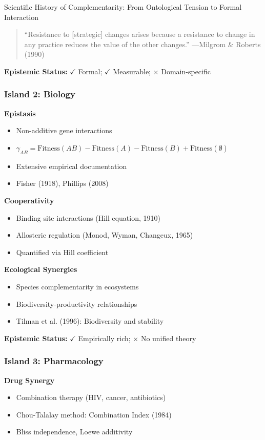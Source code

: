 \begin{chapter}{Scientific History of Complementarity: From Ontological Tension to Formal Interaction}
\begin{quote}
``Resistance to [strategic] changes arises because a resistance to change in any practice reduces the value of the other changes.'' ---Milgrom \& Roberts (1990)
\end{quote}

\textbf{Epistemic Status:} $\checkmark$ Formal; $\checkmark$ Measurable; $\times$ Domain-specific

\subsubsection{Island 2: Biology}

\textbf{Epistasis}
\begin{itemize}[noitemsep]
    \item Non-additive gene interactions
    \item $\gamma_{AB} = \text{Fitness}(AB) - \text{Fitness}(A) - \text{Fitness}(B) + \text{Fitness}(\emptyset)$
    \item Extensive empirical documentation
    \item Fisher (1918), Phillips (2008)
\end{itemize}

\textbf{Cooperativity}
\begin{itemize}[noitemsep]
    \item Binding site interactions (Hill equation, 1910)
    \item Allosteric regulation (Monod, Wyman, Changeux, 1965)
    \item Quantified via Hill coefficient
\end{itemize}

\textbf{Ecological Synergies}
\begin{itemize}[noitemsep]
    \item Species complementarity in ecosystems
    \item Biodiversity-productivity relationships
    \item Tilman et al. (1996): Biodiversity and stability
\end{itemize}

\textbf{Epistemic Status:} $\checkmark$ Empirically rich; $\times$ No unified theory

\subsubsection{Island 3: Pharmacology}

\textbf{Drug Synergy}
\begin{itemize}[noitemsep]
    \item Combination therapy (HIV, cancer, antibiotics)
    \item Chou-Talalay method: Combination Index (1984)
    \item Bliss independence, Loewe additivity
\end{itemize}


\end{chapter}
